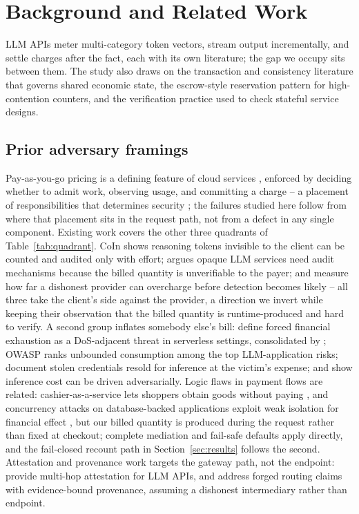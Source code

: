 \documentclass[final,5p,times,twocolumn,number]{elsarticle}
\begin{document}
\section{Background and Related Work}
\label{sec:related}
LLM APIs meter multi-category token vectors, stream output incrementally, and settle
charges after the fact, each with its own literature; the gap we occupy sits between
them. The study also draws on the transaction and consistency literature that governs
shared economic state, the escrow-style reservation pattern for high-contention counters,
and the verification practice used to check stateful service designs.

\subsection{Prior adversary framings}
Pay-as-you-go pricing is a defining feature of cloud services \citep{armbrust}, enforced
by deciding whether to admit work, observing usage, and committing a charge -- a
placement of responsibilities that determines security \citep{bass}; the failures studied
here follow from where that placement sits in the request path, not from a defect in any
single component. Existing work covers the other three quadrants of
Table~\ref{tab:quadrant}. CoIn \citep{coin} shows reasoning tokens invisible to the client
can be counted and audited only with effort; \citet{invisible} argues opaque LLM services
need audit mechanisms because the billed quantity is unverifiable to the payer; and
\citet{tokeninflation} measure how far a dishonest provider can overcharge before
detection becomes likely -- all three take the client's side against the provider, a
direction we invert while keeping their observation that the billed quantity is
runtime-produced and hard to verify. A second group inflates somebody else's bill: \citet{dow} define forced financial
exhaustion as a DoS-adjacent threat in serverless settings, consolidated by
\citet{dowreview}; OWASP \citep{owasp} ranks unbounded consumption among the top
LLM-application risks; \citet{llmjacking} document stolen credentials resold for
inference at the victim's expense; and \citet{sponge} show inference cost can be driven
adversarially. Logic flaws in payment flows are related: cashier-as-a-service lets
shoppers obtain goods without paying \citep{cashier}, and concurrency attacks on
database-backed applications exploit weak isolation for financial effect
\citep{acidrain}, but our billed quantity is produced during the request rather than
fixed at checkout; complete mediation and fail-safe defaults \citep{saltzer} apply
directly, and the fail-closed recount path in Section~\ref{sec:results} follows the
second. Attestation and provenance work targets the gateway path, not the endpoint: \citet{aex}
provide multi-hop attestation for LLM APIs, and \citet{gwprov} address forged routing
claims with evidence-bound provenance, assuming a dishonest intermediary rather than
endpoint.
\end{document}
